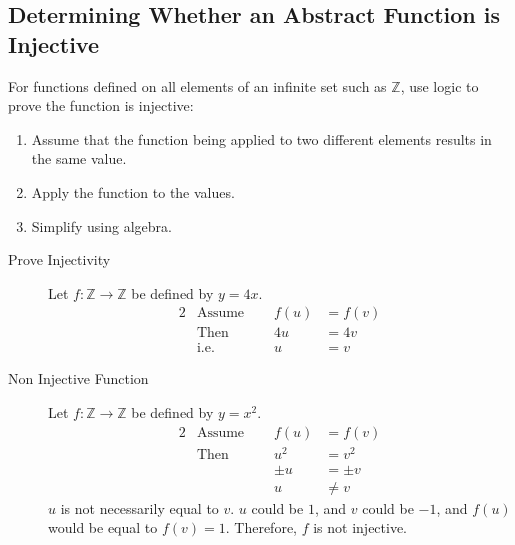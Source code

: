 \documentclass[../notes.tex]{subfiles}
\begin{document}
			\subsection{Determining Whether an Abstract Function is Injective}
				For functions defined on all elements of an infinite set such as $\mathbb{Z}$, use logic to prove the function is injective:
				\nopagebreak
				\begin{enumerate}[nosep]
					\item Assume that the function being applied to two different elements results in the same value.
					\item Apply the function to the values.
					\item Simplify using algebra.
				\end{enumerate}
				\nopagebreak
				\begin{example}
					\begin{description}
						\item[Prove Injectivity] Let $f: \mathbb{Z} \rightarrow \mathbb{Z}$ be defined by $y = 4x$.
							\begin{alignat*}{2}
								& \text{Assume } \quad &f(u) &= f(v)\tag*{$(1)$}\\
								& \text{Then } &4u &= 4v\tag*{$(2)$}\\
								& \text{i.e. } &u &= v\tag*{$(3)$}
							\end{alignat*}
						\item[Non Injective Function]  Let $f: \mathbb{Z} \rightarrow \mathbb{Z}$ be defined by $y = x^{2}$.
							\begin{alignat*}{2}
								& \text{Assume } \quad &f(u) &= f(v)\\
								& \text{Then } &u^{2} &= v^{2}\\
								& & \pm{u} &= \pm{v}\\
								& & u &\neq v
							\end{alignat*}
							$u$ is not necessarily equal to $v$. $u$ could be $1$, and $v$ could be $-1$, and $f(u)$ would be equal to $f(v) = 1$. Therefore, $f$ is not injective.
					\end{description}
				\end{example}
\end{document}
